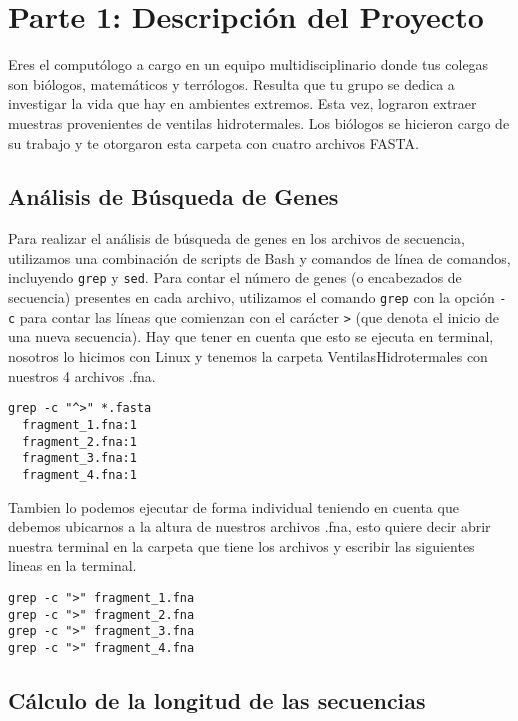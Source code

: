 \section*{Parte 1: Descripción del Proyecto} %
\label{sec:parte1} %
Eres el computólogo a cargo en un equipo multidisciplinario donde tus colegas son biólogos, matemáticos y terrólogos. Resulta que tu grupo se dedica a investigar la vida que hay en ambientes extremos. Esta vez, lograron extraer muestras provenientes de ventilas hidrotermales. Los biólogos se hicieron cargo de su trabajo y te otorgaron esta carpeta con cuatro archivos FASTA.

\subsection*{Análisis de Búsqueda de Genes}

Para realizar el análisis de búsqueda de genes en los archivos de secuencia, utilizamos una combinación de scripts de Bash y comandos de línea de comandos, incluyendo \texttt{grep} y \texttt{sed}. Para contar el número de genes (o encabezados de secuencia) presentes en cada archivo, utilizamos el comando \texttt{grep} con la opción \texttt{-c} para contar las líneas que comienzan con el carácter \texttt{>} (que denota el inicio de una nueva secuencia).
Hay que tener en cuenta que esto se ejecuta en terminal, nosotros lo hicimos con Linux y tenemos la carpeta VentilasHidrotermales con nuestros 4 archivos .fna.  

\begin{verbatim}
grep -c "^>" *.fasta
  fragment_1.fna:1
  fragment_2.fna:1
  fragment_3.fna:1
  fragment_4.fna:1
\end{verbatim}
Tambien lo podemos ejecutar de forma individual teniendo en cuenta que debemos ubicarnos a la altura de nuestros archivos .fna, esto quiere decir abrir nuestra terminal en la carpeta que tiene los archivos y escribir las siguientes lineas en la terminal. 

\begin{verbatim}
grep -c ">" fragment_1.fna
grep -c ">" fragment_2.fna
grep -c ">" fragment_3.fna
grep -c ">" fragment_4.fna
\end{verbatim}

\subsection*{Cálculo de la longitud de las secuencias}

